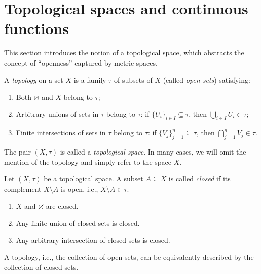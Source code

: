 \section{Topological spaces and continuous functions}

This section introduces the notion of a topological space, which abstracts
the concept of ``openness'' captured by metric spaces.

\begin{definition}
A \emph{topology} on a set $X$ is a family ${\tau}$ of subsets of $X$ (called \emph{open sets}) satisfying:
\begin{enumerate}
\item Both $\varnothing$ and $X$ belong to ${\tau}$;
\item Arbitrary unions of sets in ${\tau}$ belong to ${\tau}$: if $\{U_i\}_{i\in I}\subseteq{\tau}$, then $\bigcup_{i\in I} U_i\in{\tau}$;
\item Finite intersections of sets in ${\tau}$ belong to ${\tau}$: if $\{V_j\}_{j=1}^n\subseteq{\tau}$, then $\bigcap_{j=1}^n V_j\in{\tau}$.
\end{enumerate}
The pair $(X,{\tau})$ is called a \emph{topological space}. In many cases, we will omit the mention of the topology and simply refer to the space $X$.
\end{definition}

\begin{definition}
  Let $(X,{\tau})$ be a topological space. A subset $A\subseteq X$ is called \emph{closed} if its complement $X\setminus A$ is open, i.e., $X\setminus A\in{\tau}$.
\end{definition}
\begin{proposition}
  \begin{enumerate}
    \item $X$ and $\varnothing$ are closed.
    \item Any finite union of closed sets is closed.
    \item Any arbitrary intersection of closed sets is closed.
  \end{enumerate}
\end{proposition}
\begin{remark}
  A topology, i.e., the collection of open sets, can be equivalently described by the collection of closed sets.
\end{remark}

